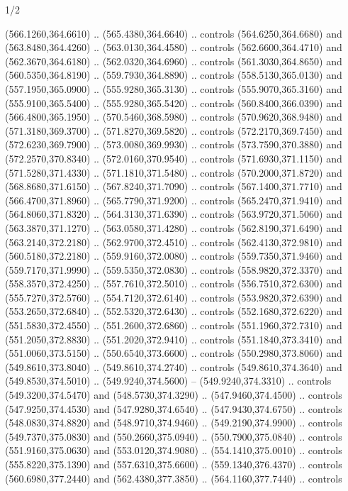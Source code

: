 \begin{flagdescription}{1/2}
\begin{scope}[xshift=0.5\flaglength,yshift=0.5\flagwidth,scale=\flagwidth/759]
\begin{scope}[y=0.8pt, x=0.8pt, yscale=-1,shift={(-720,-480)}]
\begin{scope}[cm={{1.14637,0.0,0.0,1.17117,(33.17849,82.1384)}}]
  (566.1260,364.6610) .. (565.4380,364.6640) .. controls (564.6250,364.6680) and
  (563.8480,364.4260) .. (563.0130,364.4580) .. controls (562.6600,364.4710) and
  (562.3670,364.6180) .. (562.0320,364.6960) .. controls (561.3030,364.8650) and
  (560.5350,364.8190) .. (559.7930,364.8890) .. controls (558.5130,365.0130) and
  (557.1950,365.0900) .. (555.9280,365.3130) .. controls (555.9070,365.3160) and
  (555.9100,365.5400) .. (555.9280,365.5420) .. controls (560.8400,366.0390) and
  (566.4800,365.1950) .. (570.5460,368.5980) .. controls (570.9620,368.9480) and
  (571.3180,369.3700) .. (571.8270,369.5820) .. controls (572.2170,369.7450) and
  (572.6230,369.7900) .. (573.0080,369.9930) .. controls (573.7590,370.3880) and
  (572.2570,370.8340) .. (572.0160,370.9540) .. controls (571.6930,371.1150) and
  (571.5280,371.4330) .. (571.1810,371.5480) .. controls (570.2000,371.8720) and
  (568.8680,371.6150) .. (567.8240,371.7090) .. controls (567.1400,371.7710) and
  (566.4700,371.8960) .. (565.7790,371.9200) .. controls (565.2470,371.9410) and
  (564.8060,371.8320) .. (564.3130,371.6390) .. controls (563.9720,371.5060) and
  (563.3870,371.1270) .. (563.0580,371.4280) .. controls (562.8190,371.6490) and
  (563.2140,372.2180) .. (562.9700,372.4510) .. controls (562.4130,372.9810) and
  (560.5180,372.2180) .. (559.9160,372.0080) .. controls (559.7350,371.9460) and
  (559.7170,371.9990) .. (559.5350,372.0830) .. controls (558.9820,372.3370) and
  (558.3570,372.4250) .. (557.7610,372.5010) .. controls (556.7510,372.6300) and
  (555.7270,372.5760) .. (554.7120,372.6140) .. controls (553.9820,372.6390) and
  (553.2650,372.6840) .. (552.5320,372.6430) .. controls (552.1680,372.6220) and
  (551.5830,372.4550) .. (551.2600,372.6860) .. controls (551.1960,372.7310) and
  (551.2050,372.8830) .. (551.2020,372.9410) .. controls (551.1840,373.3410) and
  (551.0060,373.5150) .. (550.6540,373.6600) .. controls (550.2980,373.8060) and
  (549.8610,373.8040) .. (549.8610,374.2740) .. controls (549.8610,374.3640) and
  (549.8530,374.5010) .. (549.9240,374.5600) -- (549.9240,374.3310) .. controls
  (549.3200,374.5470) and (548.5730,374.3290) .. (547.9460,374.4500) .. controls
  (547.9250,374.4530) and (547.9280,374.6540) .. (547.9430,374.6750) .. controls
  (548.0830,374.8820) and (548.9710,374.9460) .. (549.2190,374.9900) .. controls
  (549.7370,375.0830) and (550.2660,375.0940) .. (550.7900,375.0840) .. controls
  (551.9160,375.0630) and (553.0120,374.9080) .. (554.1410,375.0010) .. controls
  (555.8220,375.1390) and (557.6310,375.6600) .. (559.1340,376.4370) .. controls
  (560.6980,377.2440) and (562.4380,377.3850) .. (564.1160,377.7440) .. controls

\end{scope}
\end{scope}
\end{scope}
\end{flagdescription}
